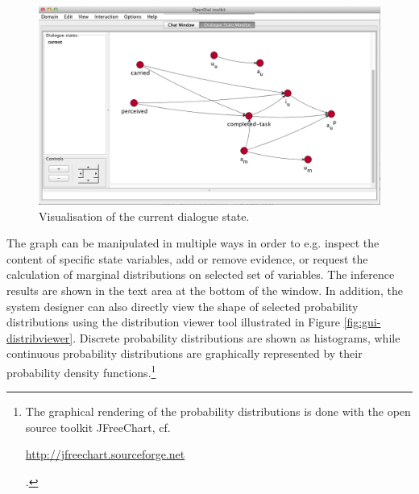 \begin{figure}[h] 
\begin{center}
\includegraphics[scale=0.40]{imgs/gui-bn.png}
\end{center} 
\caption{Visualisation of the current dialogue state.}
\label{fig:gui-bn}
\end{figure}

The graph can be manipulated in multiple ways in order to e.g. inspect the content of specific state variables, add or remove evidence, or request the calculation of marginal distributions on selected set of variables.  The inference results are shown in the text area at the bottom of the window.  In addition, the system designer can also directly view the shape of selected probability distributions using the distribution viewer tool illustrated in Figure \ref{fig:gui-distribviewer}. Discrete probability distributions are shown as histograms, while continuous probability distributions are graphically represented by their probability density functions.\footnote{The graphical rendering of the probability distributions is done with the open source toolkit JFreeChart, cf. \begin{scriptsize}\url{http://jfreechart.sourceforge.net}\end{scriptsize}.} 


